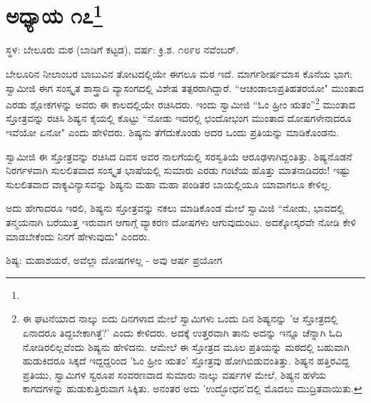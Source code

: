 \newpage

\chapter[ಅಧ್ಯಾಯ ೧೭]{ಅಧ್ಯಾಯ ೧೭\protect\footnote{}}

\begin{center}
ಸ್ಥಳ: ಬೇಲೂರು ಮಠ (ಬಾಡಿಗೆ ಕಟ್ಟಡ), ವರ್ಷ: ಕ್ರಿ.ಶ. ೧೮೯೮ ನವೆಂಬರ್.
\end{center}

ಬೇಲೂರಿನ ನೀಲಾಂಬರ ಬಾಬುವಿನ ತೋಟದಲ್ಲಿಯೇ ಈಗಲೂ ಮಠ ಇದೆ. ಮಾರ್ಗಶೀರ್ಷಮಾಸ ಕೊನೆಯ ಭಾಗ; ಸ್ವಾಮೀಜಿ ಈಗ ಸಂಸ್ಕೃತ ಶಾಸ್ತ್ರಾದಿ ವ್ಯಾಸಂಗದಲ್ಲಿ ವಿಶೇಷ ತತ್ಪರರಾಗಿದ್ದಾರೆ. “ಆಚಂಡಾಲಾಪ್ರತಿಹತರಯೋ" ಮುಂತಾದ ಎರಡು ಶ್ಲೋಕಗಳನ್ನು ಅವರು ಈ ಕಾಲದಲ್ಲಿಯೇ ರಚಿಸಿದರು. ಇಂದು ಸ್ವಾಮೀಜಿ “ಓಂ ಹ್ರೀಂ ಋತಂ”\footnote{ಈ ಘಟನೆಯಾದ ನಾಲ್ಕು ಐದು ದಿನಗಳಾದ ಮೇಲೆ ಸ್ವಾಮಿಗಳು ಒಂದು ದಿನ ಶಿಷ್ಯನನ್ನು 'ಆ ಸ್ತೋತ್ರದಲ್ಲಿ ಏನಾದರೂ ತಿದ್ದಬೇಕಾಗಿತ್ತೆ?' ಎಂದು ಕೇಳಿದರು. ಅದಕ್ಕೆ ಉತ್ತರವಾಗಿ ತಾನು ಅದನ್ನು ಇನ್ನೂ ಚೆನ್ನಾಗಿ ಓದಿ ನೋಡಿರಲಿಲ್ಲವೆಂದು ಶಿಷ್ಯನು ಹೇಳಿದನು. ಆಮೇಲೆ ಈ ಸ್ತೋತ್ರದ ಮೂಲ ಪ್ರತಿಯನ್ನು ಮಠದಲ್ಲಿ ಬಹುವಾಗಿ ಹುಡುಕಿದರೂ ಸಿಕ್ಕದೆ ಇದ್ದದ್ದರಿಂದ 'ಓಂ ಹ್ರೀಂ ಋತಂ' ಸ್ತೋತ್ರವು ಹೋಗಿಬಿಡುವಂತಿತ್ತು. ಶಿಷ್ಯನ ಹತ್ತಿರವಿದ್ದ ಪ್ರತಿಯು, ಸ್ವಾಮಿಗಳ ಸ್ವರೂಪ ಸಂವರಣವಾದ ಸುಮಾರು ನಾಲ್ಕು ವರ್ಷಗಳ ಮೇಲೆ, ಶಿಷ್ಯನ ಹಳೆಯ ಕಾಗದಗಳನ್ನು ಹುಡುಕುತ್ತಿರುವಾಗ ಸಿಕ್ಕಿತು. ಅನಂತರ ಅದು 'ಉದ್ಭೋಧನ'ದಲ್ಲಿ ಮೊದಲು ಮುದ್ರಿತವಾಯಿತು.} ಮುಂತಾದ ಸ್ತೋತ್ರವನ್ನು ರಚಿಸಿ ಶಿಷ್ಯನ ಕೈಯಲ್ಲಿ ಕೊಟ್ಟು “ನೋಡು ಇದರಲ್ಲಿ ಛಂದೋಭಂಗ ಮುಂತಾದ ದೋಷಗಳೇನಾದರೂ ಇವೆಯೋ ಏನೋ" ಎಂದು ಹೇಳಿದರು. ಶಿಷ್ಯನು ತೆಗೆದುಕೊಂಡು ಅದರ ಒಂದು ಪ್ರತಿಯನ್ನು ಮಾಡಿಕೊಂಡನು.

ಸ್ವಾಮೀಜಿ ಈ ಸ್ತೋತ್ರವನ್ನು ರಚಿಸಿದ ದಿವಸ ಅವರ ನಾಲಗೆಯಲ್ಲಿ ಸರಸ್ವತಿಯೆ ಆರೂಢಳಾಗಿದ್ದಂತಿತ್ತು. ಶಿಷ್ಯನೊಡನೆ ನಿರರ್ಗಳವಾಗಿ ಸುಲಲಿತವಾದ ಸಂಸ್ಕೃತ ಭಾಷೆಯಲ್ಲಿ ಸುಮಾರು ಎರಡು ಗಂಟೆಯ ಹೊತ್ತು ಮಾತನಾಡಿದರು! ಇಷ್ಟು ಸುಲಲಿತವಾದ ವಾಕ್ಯವಿನ್ಯಾಸವನ್ನು ಶಿಷ್ಯನು ಮಹಾ ಮಹಾ ಪಂಡಿತರ ಬಾಯಲ್ಲಿಯೂ ಯಾವಾಗಲೂ ಕೇಳಿಲ್ಲ.

ಅದು ಹೇಗಾದರೂ ಇರಲಿ, ಶಿಷ್ಯನು ಸ್ತೋತ್ರವನ್ನು ನಕಲು ಮಾಡಿಕೊಂಡ ಮೇಲೆ ಸ್ವಾಮಿಜಿ “ನೋಡು, ಭಾವದಲ್ಲಿ ತನ್ಮಯನಾಗಿ ಬರೆಯುತ್ತ ಇರುವಾಗ ಆಗಾಗ್ಗೆ ವ್ಯಾಕರಣ ದೋಷಗಳು ಆಗುವುದುಂಟು. ಅದಕ್ಕೋಸ್ಕರವೇ ನೋಡಿ ಕೇಳಿ ಮಾಡಬೇಕೆಂದು ನಿನಗೆ ಹೇಳುವುದು" ಎಂದರು.

ಶಿಷ್ಯ: ಮಹಾಶಯರೆ, ಅವೆಲ್ಲಾ ದೋಷಗಳಲ್ಲ - ಅವು ಆರ್ಷ ಪ್ರಯೋಗ

